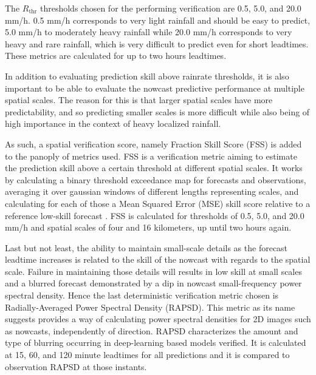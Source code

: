 The $R_{\text{thr}}$ thresholds chosen for the performing verification are 0.5, 5.0, and 20.0 mm/h. 0.5 mm/h corresponds to very light rainfall and should be easy to predict, 5.0 mm/h to moderately heavy rainfall while 20.0 mm/h corresponds to very heavy and rare rainfall, which is very difficult to predict even for short leadtimes. These metrics are calculated for up to two hours leadtimes. 

In addition to evaluating prediction skill above rainrate thresholds, it is also important to be able to evaluate the nowcast predictive performance at multiple spatial scales. The reason for this is that larger spatial scales have more predictability, and so predicting smaller scales is more difficult while also being of high importance in the context of heavy localized rainfall. 


As such, a spatial verification score, namely Fraction Skill Score (FSS) \cite{roberts_scale-selective_2008} is added to the panoply of metrics used. FSS is a verification metric aiming to estimate the prediction skill above a certain threshold at different spatial scales. It works by calculating a binary threshold exceedance map for forecasts and observations, averaging it over gaussian windows of different lengths representing scales, and calculating for each of those a Mean Squared Error (MSE) skill score relative to a reference low-skill forecast \cite{roberts_scale-selective_2008}. FSS is calculated for thresholds of 0.5, 5.0, and 20.0 mm/h and spatial scales of four and 16 kilometers, up until two hours again. 

Last but not least, the ability to maintain small-scale details as the forecast leadtime increases is related to the skill of the nowcast with regards to the spatial scale. Failure in maintaining those details will results in low skill at small scales and a blurred forecast demonstrated by a dip in nowcast small-frequency power spectral density. Hence the last deterministic verification metric chosen is Radially-Averaged Power Spectral Density (RAPSD). This metric as its name suggests provides a way of calculating power spectral densities for 2D images such as nowcasts, independently of direction. RAPSD characterizes the amount and type of blurring occurring in deep-learning based models verified. It is calculated at 15, 60, and 120 minute leadtimes for all predictions and it is compared to observation RAPSD at those instants. 

